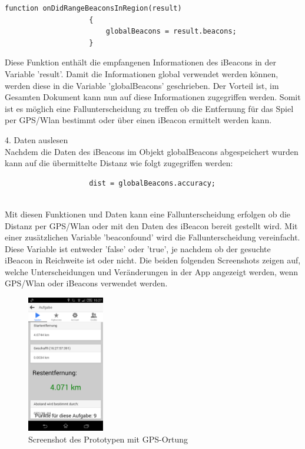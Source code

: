 \begin{lstlisting}
function onDidRangeBeaconsInRegion(result)
					{
						globalBeacons = result.beacons;
					}
\end{lstlisting}

Diese Funktion enthält die empfangenen Informationen des iBeacons in der Variable 'result'. Damit die Informationen global verwendet werden können, werden diese in die Variable 'globalBeacons' geschrieben. Der Vorteil ist, im Gesamten Dokument kann nun auf diese Informationen zugegriffen werden. Somit ist es möglich eine Fallunterscheidung zu treffen ob die Entfernung für das Spiel per GPS/Wlan bestimmt oder über einen iBeacon ermittelt werden kann.


4. Daten auslesen
\\Nachdem die Daten des iBeacons im Objekt globalBeacons abgespeichert wurden kann auf die übermittelte Distanz wie folgt zugegriffen werden:

\begin{lstlisting}
					dist = globalBeacons.accuracy;
					
\end{lstlisting}


Mit diesen Funktionen und Daten kann eine Fallunterscheidung erfolgen ob die Distanz per GPS/Wlan oder mit den Daten des iBeacon bereit gestellt wird.
Mit einer zusätzlichen Variable 'beaconfound' wird die Fallunterscheidung vereinfacht. Diese Variable ist entweder 'false' oder 'true', je nachdem ob der gesuchte iBeacon in Reichweite ist oder nicht. Die beiden folgenden Screenshots zeigen auf, welche Unterscheidungen und Veränderungen in der App angezeigt werden, wenn GPS/Wlan oder iBeacons verwendet werden.

\begin{figure}
\centering
\includegraphics[width=0.3\textwidth]{ref/images/screenshot1.png}
\caption[Screenshot des Prototypen mit GPS-Ortung]{Screenshot des Prototypen mit GPS-Ortung}
\label{fig:screenshotapp1}
\end{figure} 

